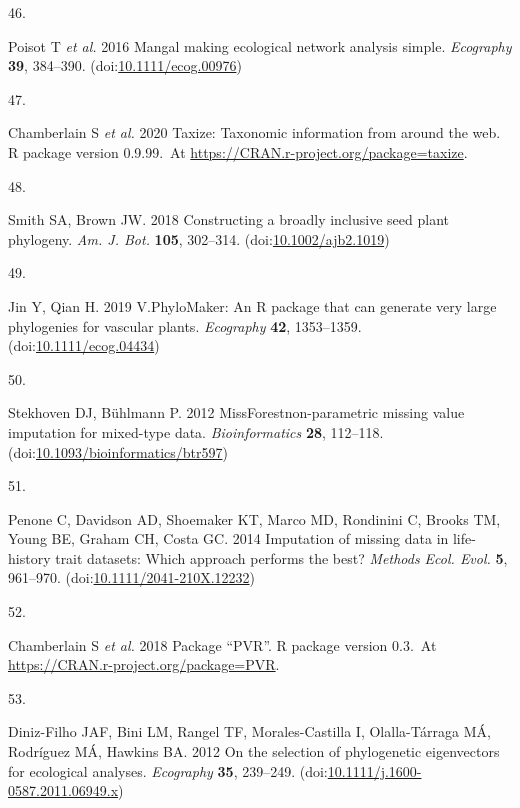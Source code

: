 \documentclass[
  12pt,
  a4paper,
]{article}
\newlength{\cslhangindent}
\newlength{\csllabelwidth}
\newlength{\cslentryspacingunit} %
\newenvironment{CSLReferences}[2] %
 {%
  \setlength{\parindent}{0pt}
  \ifodd #1
  \let\oldpar\par
  \def\par{\hangindent=\cslhangindent\oldpar}
  \fi
  \setlength{\parskip}{#2\cslentryspacingunit}
 }%
 {}
\newcommand{\CSLLeftMargin}[1]{\parbox[t]{\csllabelwidth}{#1}}
\newcommand{\CSLRightInline}[1]{\parbox[t]{\linewidth - \csllabelwidth}{#1}\break}
\begin{document}
\begin{CSLReferences}{0}{0}
\leavevmode{}%
\CSLLeftMargin{46. }
\CSLRightInline{Poisot T \emph{et al.} 2016 Mangal \textendash{} making ecological network analysis simple. \emph{Ecography} \textbf{39}, 384--390. (doi:\href{https://doi.org/10.1111/ecog.00976}{10.1111/ecog.00976})}

\leavevmode{}%
\CSLLeftMargin{47. }
\CSLRightInline{Chamberlain S \emph{et al.} 2020 Taxize: {Taxonomic} information from around the web. R package version 0.9.99.~At \href{https://CRAN.R-project.org/package=taxize}{https://CRAN.r-project.org/package=taxize}. }

\leavevmode{}%
\CSLLeftMargin{48. }
\CSLRightInline{Smith SA, Brown JW. 2018 Constructing a broadly inclusive seed plant phylogeny. \emph{Am. J. Bot.} \textbf{105}, 302--314. (doi:\href{https://doi.org/10.1002/ajb2.1019}{10.1002/ajb2.1019})}

\leavevmode{}%
\CSLLeftMargin{49. }
\CSLRightInline{Jin Y, Qian H. 2019 V.{PhyloMaker}: An {R} package that can generate very large phylogenies for vascular plants. \emph{Ecography} \textbf{42}, 1353--1359. (doi:\href{https://doi.org/10.1111/ecog.04434}{10.1111/ecog.04434})}

\leavevmode{}%
\CSLLeftMargin{50. }
\CSLRightInline{Stekhoven DJ, Bühlmann P. 2012 {MissForest}\textemdash non-parametric missing value imputation for mixed-type data. \emph{Bioinformatics} \textbf{28}, 112--118. (doi:\href{https://doi.org/10.1093/bioinformatics/btr597}{10.1093/bioinformatics/btr597})}

\leavevmode{}%
\CSLLeftMargin{51. }
\CSLRightInline{Penone C, Davidson AD, Shoemaker KT, Marco MD, Rondinini C, Brooks TM, Young BE, Graham CH, Costa GC. 2014 Imputation of missing data in life-history trait datasets: Which approach performs the best? \emph{Methods Ecol. Evol.} \textbf{5}, 961--970. (doi:\href{https://doi.org/10.1111/2041-210X.12232}{10.1111/2041-210X.12232})}

\leavevmode{}%
\CSLLeftMargin{52. }
\CSLRightInline{Chamberlain S \emph{et al.} 2018 Package {``{PVR}''}. R package version 0.3.~At \href{https://CRAN.R-project.org/package=PVR}{https://CRAN.r-project.org/package=PVR}. }

\leavevmode{}%
\CSLLeftMargin{53. }
\CSLRightInline{Diniz-Filho JAF, Bini LM, Rangel TF, Morales-Castilla I, Olalla-Tárraga MÁ, Rodríguez MÁ, Hawkins BA. 2012 On the selection of phylogenetic eigenvectors for ecological analyses. \emph{Ecography} \textbf{35}, 239--249. (doi:\href{https://doi.org/10.1111/j.1600-0587.2011.06949.x}{10.1111/j.1600-0587.2011.06949.x})}


\end{CSLReferences}
\end{document}
